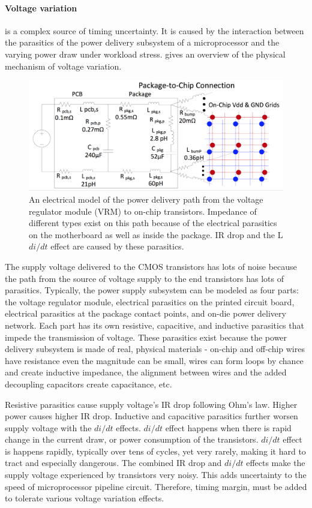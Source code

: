 \paragraph{Voltage variation} is a complex source of timing uncertainty. It is caused by the interaction between the parasitics of the power delivery subsystem of a microprocessor and the varying power draw under workload stress.  gives an overview of the physical mechanism of voltage variation.

\begin{figure}[t!]
  \centering
  \includegraphics[trim=0 0 0 0,clip,width=0.8\linewidth]{graphs/pdn-model.png}
  \caption{An electrical model of the power delivery path from the voltage regulator module (VRM) to on-chip transistors. Impedance of different types exist on this path because of the electrical parasitics on the motherboard as well as inside the package. IR drop and the L$di/dt$ effect are caused by these parasitics.}
  \label{fig:pdn-model}
\end{figure}

The supply voltage delivered to the CMOS transistors has lots of noise because the path from the source of voltage supply to the end transistors has lots of parasitics. Typically, the power supply subsystem can be modeled as four parts: the voltage regulator module, electrical parasitics on the printed circuit board, electrical parasitics at the package contact points, and on-die power delivery network. Each part has its own resistive, capacitive, and inductive parasitics that impede the transmission of voltage. These parasitics exist because the power delivery subsystem is made of real, physical materials - on-chip and off-chip wires have resistance even the magnitude can be small, wires can form loops by chance and create inductive impedance, the alignment between wires and the added decoupling capacitors create capacitance, etc.

Resistive parasitics cause supply voltage's IR drop following Ohm's law. Higher power causes higher IR drop. Inductive and capacitive parasitics further worsen supply voltage with the $di/dt$ effects. $di/dt$ effect happens when there is rapid change in the current draw, or power consumption of the transistors. $di/dt$ effect is happens rapidly, typically over tens of cycles, yet very rarely, making it hard to tract and especially dangerous. The combined IR drop and $di/dt$ effects make the supply voltage experienced by transistors very noisy. This adds uncertainty to the speed of microprocessor pipeline circuit. Therefore, timing margin, must be added to tolerate various voltage variation effects.

